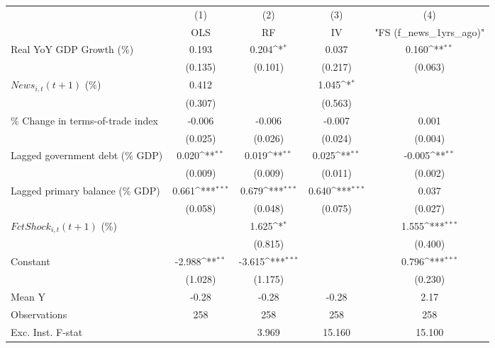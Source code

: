 {
\def\sym#1{\ifmmode^{#1}\else\(^{#1}\)\fi}
\begin{tabular}{l*{4}{c}}
\toprule
                    &\multicolumn{1}{c}{(1)}&\multicolumn{1}{c}{(2)}&\multicolumn{1}{c}{(3)}&\multicolumn{1}{c}{(4)}\\
                    &\multicolumn{1}{c}{OLS}&\multicolumn{1}{c}{RF}&\multicolumn{1}{c}{IV}&\multicolumn{1}{c}{ "FS (f_news_1yrs_ago)" }\\
\midrule
Real YoY GDP Growth (\%)&       0.193         &       0.204\sym{*}  &       0.037         &       0.160\sym{**} \\
                    &     (0.135)         &     (0.101)         &     (0.217)         &     (0.063)         \\
\addlinespace
$ News_{i,t}(t+1)$ (\%)&       0.412         &                     &       1.045\sym{*}  &                     \\
                    &     (0.307)         &                     &     (0.563)         &                     \\
\addlinespace
\% Change in terms-of-trade index&      -0.006         &      -0.006         &      -0.007         &       0.001         \\
                    &     (0.025)         &     (0.026)         &     (0.024)         &     (0.004)         \\
\addlinespace
Lagged government debt (\% GDP)&       0.020\sym{**} &       0.019\sym{**} &       0.025\sym{**} &      -0.005\sym{**} \\
                    &     (0.009)         &     (0.009)         &     (0.011)         &     (0.002)         \\
\addlinespace
Lagged primary balance (\% GDP)&       0.661\sym{***}&       0.679\sym{***}&       0.640\sym{***}&       0.037         \\
                    &     (0.058)         &     (0.048)         &     (0.075)         &     (0.027)         \\
\addlinespace
$ FctShock_{i,t}(t+1)$ (\%)&                     &       1.625\sym{*}  &                     &       1.555\sym{***}\\
                    &                     &     (0.815)         &                     &     (0.400)         \\
\addlinespace
Constant            &      -2.988\sym{**} &      -3.615\sym{***}&                     &       0.796\sym{***}\\
                    &     (1.028)         &     (1.175)         &                     &     (0.230)         \\
\midrule
Mean Y              &       -0.28         &       -0.28         &       -0.28         &        2.17         \\
Observations        &         258         &         258         &         258         &         258         \\
Exc. Inst. F-stat   &                     &       3.969         &      15.160         &      15.100         \\
\bottomrule
\end{tabular}
}
